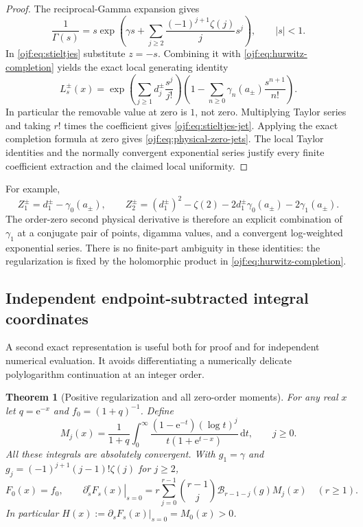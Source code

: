 \documentclass[11pt,a4paper]{article}
\numberwithin{equation}{section}
\newtheorem{theorem}{Theorem}[section]
\theoremstyle{definition}\newtheorem{definition}[theorem]{Definition}
\theoremstyle{remark}\newtheorem{remark}[theorem]{Remark}
\newcommand{\ee}{\mathrm e}\newcommand{\ii}{\mathrm i}\newcommand{\dd}{\,\mathrm d}
\newcommand{\B}{\mathcal B}\newcommand{\calF}{\mathcal F}\newcommand{\calL}{\mathcal L}
\begin{document}
\begin{proof}
The reciprocal-Gamma expansion \cite[\S5.7]{DLMFgamma} gives
\[
 \frac1{\Gamma(s)}=s\exp\left(\gamma s+
           \sum_{j\ge2}\frac{(-1)^{j+1}\zeta(j)}j s^j\right),
 \qquad |s|<1.
\]
In \eqref{ojf:eq:stieltjes} substitute $z=-s$. Combining it with
\eqref{ojf:eq:hurwitz-completion} yields the exact local generating
identity
\begin{equation}\label{ojf:eq:stieltjes-generating}
 L_s^\pm(x)=
 \exp\left(\sum_{j\ge1}d_j^\pm\frac{s^j}{j!}\right)
       \left(1-\sum_{n\ge0}\gamma_n(a_\pm)\frac{s^{n+1}}{n!}\right).
\end{equation}
In particular the removable value at zero is $1$, not zero. Multiplying
Taylor series and taking $r!$ times the coefficient gives
\eqref{ojf:eq:stieltjes-jet}. Applying the exact completion formula at
zero gives \eqref{ojf:eq:physical-zero-jets}. The local Taylor identities
and the normally convergent exponential series justify every finite
coefficient extraction and the claimed local uniformity.
\end{proof}

For example,
\[
 Z_1^\pm=d_1^\pm-\gamma_0(a_\pm),\qquad
 Z_2^\pm=(d_1^\pm)^2-\zeta(2)
                   -2d_1^\pm\gamma_0(a_\pm)-2\gamma_1(a_\pm).
\]
The order-zero second physical derivative is therefore an explicit
combination of $\gamma_1$ at a conjugate pair of points, digamma values,
and a convergent log-weighted exponential series. There is no finite-part
ambiguity in these identities: the regularization is fixed by the
holomorphic product in \eqref{ojf:eq:hurwitz-completion}.

\subsection{Independent endpoint-subtracted integral coordinates}
A second exact representation is useful both for proof and for independent
numerical evaluation. It avoids differentiating a numerically delicate
polylogarithm continuation at an integer order.

\begin{theorem}[Positive regularization and all zero-order moments]
\label{ojf:thm:regularization}
For any real $x$ let $q=\ee^{-x}$ and $f_0=(1+q)^{-1}$. Define
\begin{equation}\label{ojf:eq:moments}
 M_j(x)=\frac1{1+q}\int_0^\infty
       \frac{(1-\ee^{-t})(\log t)^j}{t(1+\ee^{t-x})}\dd t,
       \qquad j\ge0.
\end{equation}
All these integrals are absolutely convergent. With
$g_1=\gamma$ and $g_j=(-1)^{j+1}(j-1)!\zeta(j)$ for $j\ge2$,
\begin{equation}\label{ojf:eq:moment-jets}
 F_0(x)=f_0,\qquad
 \left.\partial_s^rF_s(x)\right|_{s=0}
   =r\sum_{j=0}^{r-1}\binom{r-1}{j}\B_{r-1-j}(g)M_j(x)
       \quad(r\ge1).
\end{equation}
In particular $H(x):=\partial_sF_s(x)|_{s=0}=M_0(x)>0$.
\end{theorem}
\end{document}
